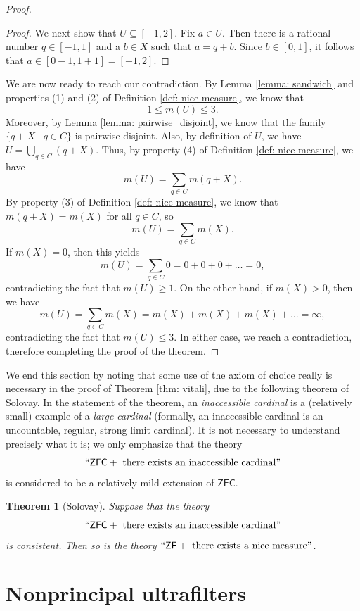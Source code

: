 \documentclass[a4paper]{memoir}
\newtheorem{theorem}{Theorem}[section]
\theoremstyle{definition}
\begin{document}
\begin{proof}
\begin{proof}
    We next show that $U \subseteq [-1,2]$. Fix $a \in U$. Then there is a rational number 
    $q \in [-1,1]$ and a $b \in X$ such that $a = q + b$. Since $b \in [0,1]$, it follows 
    that $a \in [0-1, 1+1] = [-1,2]$.
  \end{proof}
  We are now ready to reach our contradiction. By Lemma \ref{lemma: sandwich} and 
  properties (1) and (2) of Definition \ref{def: nice measure}, we know that
  \[
    1 \leq m(U) \leq 3.
  \]
  Moreover, by Lemma \ref{lemma: pairwise_disjoint}, we know that the family $\{q + X 
  \mid q \in C\}$ is pairwise disjoint. Also, by definition of $U$, we have 
  $U = \bigcup_{q \in C} (q + X)$. Thus, by property (4) of Definition \ref{def: nice measure}, 
  we have
  \[
    m(U) = \sum_{q \in C} m(q + X).
  \]
  By property (3) of Definition \ref{def: nice measure}, we know that $m(q + X) = m(X)$ for all 
  $q \in C$, so
  \[
    m(U) = \sum_{q \in C} m(X).
  \]
  If $m(X) = 0$, then this yields
  \[
    m(U) = \sum_{q \in C} 0 =0 + 0 + 0 + \ldots =  0,
  \]
  contradicting the fact that $m(U) \geq 1$. On the other hand, if $m(X) > 0$, then we have
  \[
    m(U) = \sum_{q \in C} m(X) = m(X) + m(X) + m(X) + \ldots = \infty,
  \]
  contradicting the fact that $m(U) \leq 3$. In either case, we reach a contradiction, therefore 
  completing the proof of the theorem.
\end{proof}

We end this section by noting that some use of the axiom of choice really is necessary in the proof 
of Theorem \ref{thm: vitali}, due to the following theorem of Solovay. In the statement of the 
theorem, an \emph{inaccessible cardinal} is a (relatively small) example of a \emph{large cardinal} 
(formally, an inaccessible cardinal is an uncountable, regular, strong limit cardinal). It is not 
necessary to understand precisely what it is; we only emphasize that the theory 
\[
``\mathsf{ZFC} + \text{ there exists an inaccessible cardinal}"
\] 
is considered to be a relatively mild extension of $\mathsf{ZFC}$.

\begin{theorem}[Solovay]
  Suppose that the theory 
  \[
  ``\mathsf{ZFC} + \text{ there exists an inaccessible cardinal}"
  \]
  is consistent. Then so is the theory $``\mathsf{ZF} + \text{ there exists a nice measure}"$.
\end{theorem}

\section{Nonprincipal ultrafilters}
\end{document}
